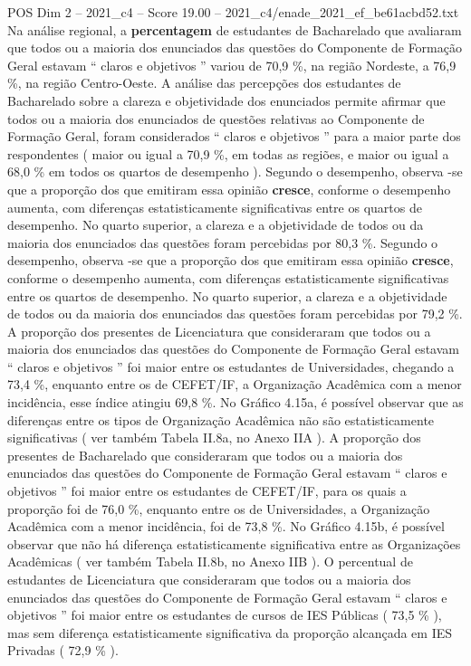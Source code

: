 \begin{textsample}{POS Dim 2 – 2021\_c4 – Score 19.00 – 2021\_c4/enade\_2021\_ef\_be61acbd52.txt}
Na análise regional, a \textbf{percentagem} de estudantes de Bacharelado que avaliaram que todos ou a maioria dos enunciados das questões do Componente de Formação Geral estavam “ claros e objetivos ” variou de 70,9 \%, na região Nordeste, a 76,9 \%, na região Centro-Oeste.
A análise das percepções dos estudantes de Bacharelado sobre a clareza e objetividade dos enunciados permite afirmar que todos ou a maioria dos enunciados de questões relativas ao Componente de Formação Geral, foram considerados “ claros e objetivos ” para a maior parte dos respondentes ( maior ou igual a 70,9 \%, em todas as regiões, e maior ou igual a 68,0 \% em todos os quartos de desempenho ).
Segundo o desempenho, observa -se que a proporção dos que emitiram essa opinião \textbf{cresce}, conforme o desempenho aumenta, com diferenças estatisticamente significativas entre os quartos de desempenho.
No quarto superior, a clareza e a objetividade de todos ou da maioria dos enunciados das questões foram percebidas por 80,3 \%.
Segundo o desempenho, observa -se que a proporção dos que emitiram essa opinião \textbf{cresce}, conforme o desempenho aumenta, com diferenças estatisticamente significativas entre os quartos de desempenho.
No quarto superior, a clareza e a objetividade de todos ou da maioria dos enunciados das questões foram percebidas por 79,2 \%.
A proporção dos presentes de Licenciatura que consideraram que todos ou a maioria dos enunciados das questões do Componente de Formação Geral estavam “ claros e objetivos ” foi maior entre os estudantes de Universidades, chegando a 73,4 \%, enquanto entre os de CEFET/IF, a Organização Acadêmica com a menor incidência, esse índice atingiu 69,8 \%.
No Gráfico 4.15a, é possível observar que as diferenças entre os tipos de Organização Acadêmica não são estatisticamente significativas ( ver também Tabela II.8a, no Anexo IIA ).
A proporção dos presentes de Bacharelado que consideraram que todos ou a maioria dos enunciados das questões do Componente de Formação Geral estavam “ claros e objetivos ” foi maior entre os estudantes de CEFET/IF, para os quais a proporção foi de 76,0 \%, enquanto entre os de Universidades, a Organização Acadêmica com a menor incidência, foi de 73,8 \%.
No Gráfico 4.15b, é possível observar que não há diferença estatisticamente significativa entre as Organizações Acadêmicas ( ver também Tabela II.8b, no Anexo IIB ).
O percentual de estudantes de Licenciatura que consideraram que todos ou a maioria dos enunciados das questões do Componente de Formação Geral estavam “ claros e objetivos ” foi maior entre os estudantes de cursos de IES Públicas ( 73,5 \% ), mas sem diferença estatisticamente significativa da proporção alcançada em IES Privadas ( 72,9 \% ).

\end{textsample}
